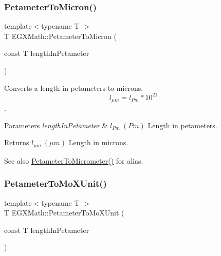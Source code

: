 \subsubsection{\texorpdfstring{Petameter\+To\+Micron()}{PetameterToMicron()}}
{\footnotesize\ttfamily template$<$typename T $>$ \\
T E\+G\+X\+Math\+::\+Petameter\+To\+Micron (\begin{DoxyParamCaption}\item[{const T}]{length\+In\+Petameter }\end{DoxyParamCaption})}



Converts a length in petameters to microns. \[ l_{\mu m}=l_{Pm} * 10^{21} \]. 


\begin{DoxyParams}{Parameters}
{\em length\+In\+Petameter} & $ l_{Pm}\ (Pm)$ Length in petameters. \\
\hline
\end{DoxyParams}
\begin{DoxyReturn}{Returns}
$ l_{\mu m}\ (\mu m)$ Length in microns. 
\end{DoxyReturn}
\begin{DoxySeeAlso}{See also}
\mbox{\hyperlink{group___e_g_x_math-_conversions-_length_conversions-_s_i-_petameter-_s_i_ga3cbe403b66dcb4d5abca922fc48a9a1c}{Petameter\+To\+Micrometer()}} for alias. 
\end{DoxySeeAlso}
\mbox{\label{group___e_g_x_math-_conversions-_length_conversions-_s_i-_petameter-_non-_s_i_ga29419ba09bb33a7bc9e23f8cde2efea3}} 
\subsubsection{\texorpdfstring{Petameter\+To\+Mo\+X\+Unit()}{PetameterToMoXUnit()}}
{\footnotesize\ttfamily template$<$typename T $>$ \\
T E\+G\+X\+Math\+::\+Petameter\+To\+Mo\+X\+Unit (\begin{DoxyParamCaption}\item[{const T}]{length\+In\+Petameter }\end{DoxyParamCaption})}



